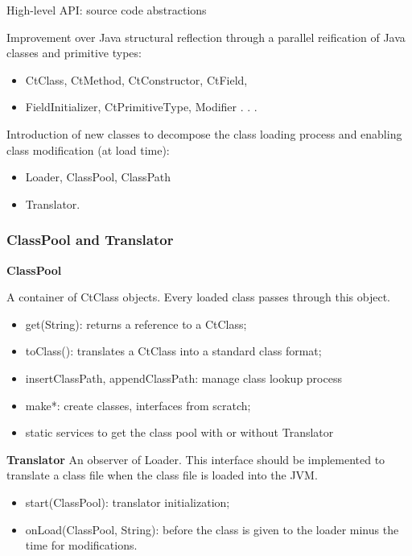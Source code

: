 High-level API: source code abstractions

Improvement over Java structural reflection through a parallel reification of Java classes and primitive types:

\begin{itemize}
	\item CtClass, CtMethod, CtConstructor, CtField,
	\item FieldInitializer, CtPrimitiveType, Modifier . . .
\end{itemize}

Introduction of new classes to decompose the class loading process and enabling class modification (at load time):

\begin{itemize}
	\item Loader, ClassPool, ClassPath
	\item Translator.
\end{itemize}

\subsubsection{ClassPool and Translator}

\textbf{ClassPool}

A container of CtClass objects. Every loaded class passes through this object.

\begin{itemize}
	\item get(String): returns a reference to a CtClass;
	\item toClass(): translates a CtClass into a standard class format;
	\item insertClassPath, appendClassPath: manage class lookup process
	\item make*: create classes, interfaces from scratch;
	\item static services to get the class pool with or without Translator
\end{itemize}

\textbf{Translator}
An observer of Loader. This interface should be implemented to translate a class file when the class file is loaded into the JVM.

\begin{itemize}
	\item start(ClassPool): translator initialization;
	\item onLoad(ClassPool, String): before the class is given to the loader minus the time for modifications.
\end{itemize}

